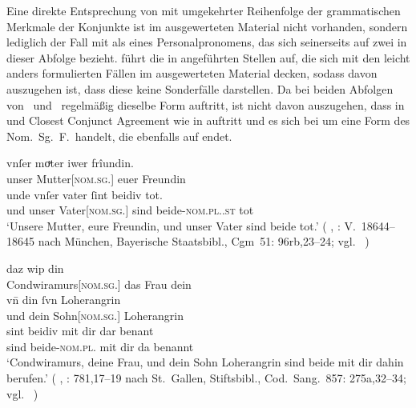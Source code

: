 Eine direkte Entsprechung von  mit umgekehrter Reihenfolge der
grammatischen Merkmale der Konjunkte ist im
ausgewerteten Material nicht vorhanden, sondern lediglich der Fall mit
 als  eines
Personalpronomens, das sich seinerseits auf zwei
 in dieser Abfolge bezieht. \citet[96, 145]{askedal1973} führt
die in  angeführten Stellen auf, die sich mit den leicht
anders formulierten Fällen im ausgewerteten Material decken, sodass davon
auszugehen ist, dass diese keine Sonderfälle darstellen. Da bei beiden Abfolgen
von \MascM\ und \FemF\ regelmäßig dieselbe Form  auftritt, ist
nicht davon auszugehen, dass in  und 
Closest Conjunct Agreement wie in 
auftritt und es sich bei  um eine Form des Nom.~Sg.~F.\ handelt,
die ebenfalls auf  endet.

\begin{exe}
	\ex \label{ex:askfmbeidiu}
		\begin{xlist}
		\ex \gll vnſer moͮter iwer frîundin. \\
				unser Mutter[\textsc{nom.sg.\FemF}] euer Freundin \\
		\sn \gll unde vnſer vater ſint beidiv tot. \\
				und unser Vater[\textsc{nom.sg.\MascM}] sind
				beide-\textsc{nom.pl.\NeutMF.st} tot \\
			\trans `Unsere Mutter, eure Freundin, und unser Vater sind beide
				tot.'
				(%
					, : V.~18644--18645
					nach München, Bayerische Staatsbibl., Cgm~51: 96rb,23--24;
					vgl.~\cite[259]{maroldschroeder1969}%
				)
			\label{ex:askfmbeidiu_1}
	
		\ex {} daz wip din \\
				Condwiramurs[\textsc{nom.sg.\FemF}] das Frau dein \\
		\sn \gll vn̄ din ſvn Loherangrin \\
				und dein Sohn[\textsc{nom.sg.\MascM}] Loherangrin \\
		\sn \gll sint beidiv mit dir dar benant \\
				sind beide-\textsc{nom.pl.\NeutMF} mit dir da benannt \\
		\trans `Condwiramurs, deine Frau, und dein Sohn Loherangrin
			sind beide mit dir dahin berufen.'
			(%
				, : 781,17--19
				nach St.~Gallen, Stiftsbibl., Cod.~Sang.~857: 275a,32--34;
				vgl.~\cite[785]{knechtschirok2003}%
			)
			\label{ex:askfmbeidiu_2}
	\end{xlist}
\end{exe}

